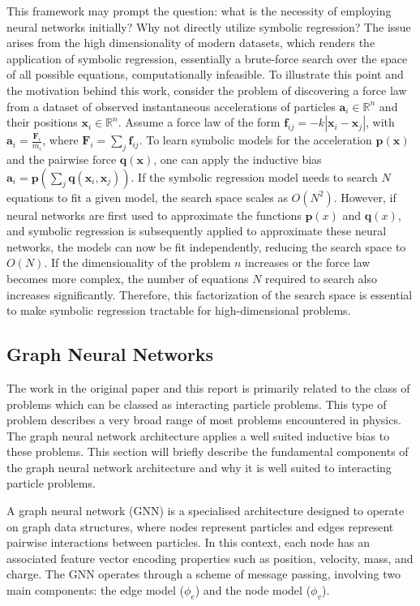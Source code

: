 \documentclass[11pt]{article}
\begin{document}
This framework may prompt the question: what is the necessity of employing neural networks initially? Why not directly utilize symbolic regression? The issue arises from the high dimensionality of modern datasets, which renders the application of symbolic regression, essentially a brute-force search over the space of all possible equations, computationally infeasible. To illustrate this point and the motivation behind this work, consider the problem of discovering a force law from a dataset of observed instantaneous accelerations of particles $\mathbf{a}_i \in \mathbb{R}^n$ and their positions $\mathbf{x}_i \in \mathbb{R}^n$. Assume a force law of the form $\mathbf{f}_{ij} = -k |\mathbf{x}_i - \mathbf{x}_j|$, with $\mathbf{a}_i = \frac{\mathbf{F}_i}{m_i}$, where $\mathbf{F}_i = \sum_j \mathbf{f}_{ij}$. To learn symbolic models for the acceleration $\textbf{p}(\textbf{x})$ and the pairwise force $\textbf{q}(\textbf{x})$, one can apply the inductive bias $\textbf{a}_i = \textbf{p}(\sum_j \textbf{q}(\textbf{x}_i, \textbf{x}_j))$. If the symbolic regression model needs to search $N$ equations to fit a given model, the search space scales as $O(N^2)$. However, if neural networks are first used to approximate the functions $\mathbf{p}(x)$ and $\mathbf{q}(x)$, and symbolic regression is subsequently applied to approximate these neural networks, the models can now be fit independently, reducing the search space to $O(N)$. If the dimensionality of the problem $n$ increases or the force law becomes more complex, the number of equations $N$ required to search also increases significantly. Therefore, this factorization of the search space is essential to make symbolic regression tractable for high-dimensional problems.
\subsection{Graph Neural Networks}
The work in the original paper and this report is primarily related to the class of problems which can be classed as interacting particle problems. This type of problem describes a very broad range of most problems encountered in physics. The graph neural network architecture applies a well suited inductive bias to these problems. This section will briefly describe the fundamental components of the graph neural network architecture and why it is well suited to interacting particle problems.

A graph neural network (GNN) is a specialised architecture designed to operate on graph data structures, where nodes represent particles and edges represent pairwise interactions between particles. In this context, each node has an associated feature vector encoding properties such as position, velocity, mass, and charge. The GNN operates through a scheme of message passing, involving two main components: the edge model ($\phi_e$) and the node model ($\phi_v$).
\end{document}
